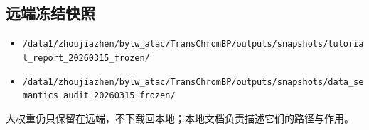 \documentclass[11pt,a4paper]{ctexart}
\begin{document}
\subsection*{远端冻结快照}
\begin{itemize}[leftmargin=2em]
  \item \texttt{/data1/zhoujiazhen/bylw\_atac/TransChromBP/outputs/snapshots/tutorial\_report\_20260315\_frozen/}
  \item \texttt{/data1/zhoujiazhen/bylw\_atac/TransChromBP/outputs/snapshots/data\_semantics\_audit\_20260315\_frozen/}
\end{itemize}

大权重仍只保留在远端，不下载回本地；本地文档负责描述它们的路径与作用。
\end{document}
